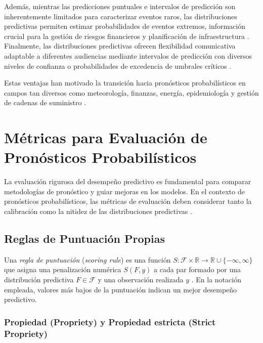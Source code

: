 Además, mientras las predicciones puntuales e intervalos de predicción son inherentemente limitados para caracterizar eventos raros, las distribuciones predictivas permiten estimar probabilidades de eventos extremos, información crucial para la gestión de riesgos financieros y planificación de infraestructura \parencite{Thorarinsdottir2017}. Finalmente, las distribuciones predictivas ofrecen flexibilidad comunicativa adaptable a diferentes audiencias mediante intervalos de predicción con diversos niveles de confianza o probabilidades de excedencia de umbrales críticos \parencite{Gneiting2014}.

Estas ventajas han motivado la transición hacia pronósticos probabilísticos en campos tan diversos como meteorología, finanzas, energía, epidemiología y gestión de cadenas de suministro \parencite{Gneiting2014, Salinas2020}.

\section{Métricas para Evaluación de Pronósticos Probabilísticos}
\label{sec:metricas_evaluacion}

La evaluación rigurosa del desempeño predictivo es fundamental para comparar metodologías de pronóstico y guiar mejoras en los modelos. En el contexto de pronósticos probabilísticos, las métricas de evaluación deben considerar tanto la calibración como la nitidez de las distribuciones predictivas \parencite{GneitingBalabdaoui2007, Thorarinsdottir2017}.

\subsection{Reglas de Puntuación Propias}
\label{subsec:scoring_rules}

Una \textit{regla de puntuación} (\textit{scoring rule}) es una función $S: \mathcal{F} \times \mathbb{R} \to \mathbb{R} \cup \{-\infty, \infty\}$ que asigna una penalización numérica $S(F,y)$ a cada par formado por una distribución predictiva $F \in \mathcal{F}$ y una observación realizada $y$ \parencite{GneitingRaftery2007}. En la notación empleada, valores más bajos de la puntuación indican un mejor desempeño predictivo.

\subsubsection{Propiedad (Propriety) y Propiedad estricta (Strict Propriety)}

